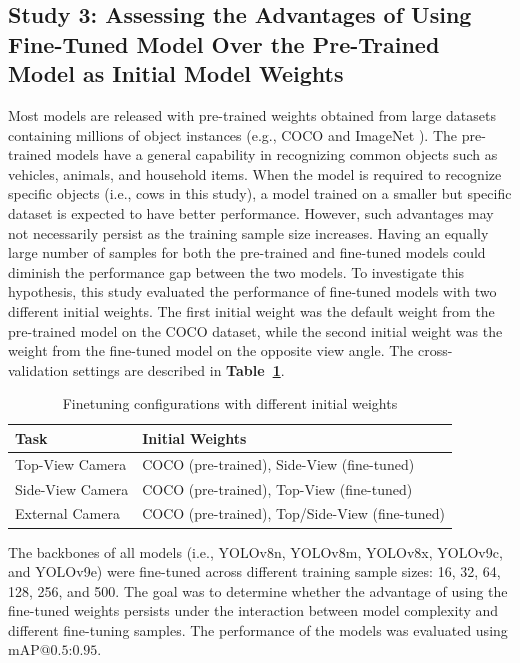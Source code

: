 \subsection{Study 3: Assessing the Advantages of Using Fine-Tuned Model Over the Pre-Trained Model as Initial Model Weights}
Most models are released with pre-trained weights obtained from large datasets containing millions of object instances (e.g., COCO \cite{lin2014microsoft} and ImageNet \cite{deng2009imagenet}). The pre-trained models have a general capability in recognizing common objects such as vehicles, animals, and household items. When the model is required to recognize specific objects (i.e., cows in this study), a model trained on a smaller but specific dataset is expected to have better performance. However, such advantages may not necessarily persist as the training sample size increases. Having an equally large number of samples for both the pre-trained and fine-tuned models could diminish the performance gap between the two models. To investigate this hypothesis, this study evaluated the performance of fine-tuned models with two different initial weights. The first initial weight was the default weight from the pre-trained model on the COCO dataset, while the second initial weight was the weight from the fine-tuned model on the opposite view angle. The cross-validation settings are described in \textbf{Table~\ref{tab:fintune_config}}.

\begin{table}[H]
    \caption{Finetuning configurations with different initial weights}
    \centering
    \begin{tabular}{|l|l|}
        \hline
        \textbf{Task} & \textbf{Initial Weights} \\
        \hline
        Top-View Camera & COCO (pre-trained), Side-View (fine-tuned) \\
        
        Side-View Camera & COCO (pre-trained), Top-View (fine-tuned) \\
        External Camera & COCO (pre-trained), Top/Side-View (fine-tuned) \\
        \hline
    \end{tabular}
    \label{tab:fintune_config}
\end{table}
The backbones of all models (i.e., YOLOv8n, YOLOv8m, YOLOv8x, YOLOv9c, and YOLOv9e) were fine-tuned across different training sample sizes: 16, 32, 64, 128, 256, and 500. The goal was to determine whether the advantage of using the fine-tuned weights persists under the interaction between model complexity and different fine-tuning samples. The performance of the models was evaluated using $\text{mAP@{0.5:0.95}}$.
